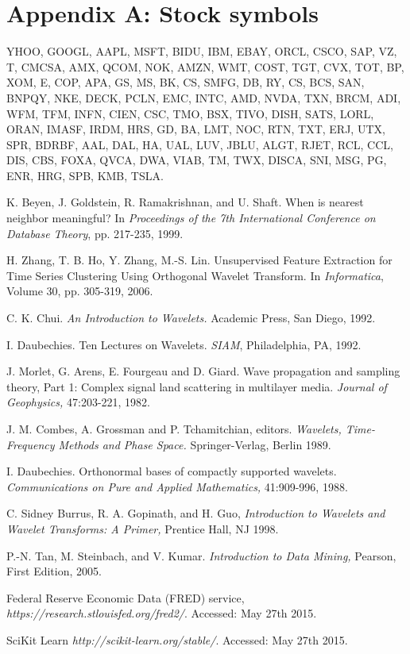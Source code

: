 \documentclass{article}
\begin{document}
\appendix
\section*{Appendix A: Stock symbols}
\label{AppA}

YHOO, GOOGL, AAPL, MSFT, BIDU, IBM, EBAY, ORCL, CSCO, SAP, VZ, T, CMCSA, AMX, QCOM, NOK, AMZN, WMT, COST, TGT, CVX, TOT, BP, XOM, E, COP, APA, GS, MS, BK, CS, SMFG, DB, RY, CS, BCS, SAN, BNPQY, NKE, DECK, PCLN, EMC, INTC, AMD, NVDA, TXN, BRCM, ADI, WFM, TFM, INFN, CIEN, CSC, TMO, BSX, TIVO, DISH, SATS, LORL, ORAN, IMASF, IRDM, HRS, GD, BA, LMT, NOC, RTN, TXT, ERJ, UTX, SPR, BDRBF, AAL, DAL, HA, UAL, LUV, JBLU, ALGT, RJET, RCL, CCL, DIS, CBS, FOXA, QVCA, DWA, VIAB, TM, TWX, DISCA, SNI, MSG, PG, ENR, HRG, SPB, KMB, TSLA.


\begin{thebibliography}{1}

 K. Beyen, J. Goldstein, R. Ramakrishnan, and U. Shaft. When is nearest neighbor meaningful? In {\em Proceedings of the 7th International Conference on Database Theory}, pp. 217-235, 1999.

 H. Zhang, T. B. Ho, Y. Zhang, M.-S. Lin. Unsupervised Feature Extraction for Time Series Clustering Using Orthogonal Wavelet Transform. In {\em Informatica}, Volume 30, pp. 305-319, 2006.

 C. K. Chui. {\em An Introduction to Wavelets.} Academic Press, San Diego, 1992.

 I. Daubechies. Ten Lectures on Wavelets. {\em SIAM}, Philadelphia, PA, 1992.

 J. Morlet, G. Arens, E. Fourgeau and D. Giard. Wave propagation and sampling theory, Part 1: Complex  signal land scattering in multilayer media. {\em Journal of Geophysics,} 47:203-221, 1982.

 J. M. Combes, A. Grossman and P. Tchamitchian, editors. {\em Wavelets, Time-Frequency Methods and Phase Space.} Springer-Verlag, Berlin 1989.

 I. Daubechies. Orthonormal bases of compactly supported wavelets. {\em Communications on Pure and Applied Mathematics,} 41:909-996, 1988.

 C. Sidney Burrus, R. A. Gopinath, and H. Guo, {\em Introduction to Wavelets and Wavelet Transforms: A Primer,} Prentice Hall, NJ 1998.

 P.-N. Tan, M. Steinbach, and V. Kumar. {\em Introduction to Data Mining,} Pearson, First Edition, 2005.

 Federal Reserve Economic Data (FRED) service, {\em https://research.stlouisfed.org/fred2/}. Accessed: May 27th 2015.

 SciKit Learn {\em http://scikit-learn.org/stable/}. Accessed: May 27th 2015.

\end{thebibliography}
\end{document}
